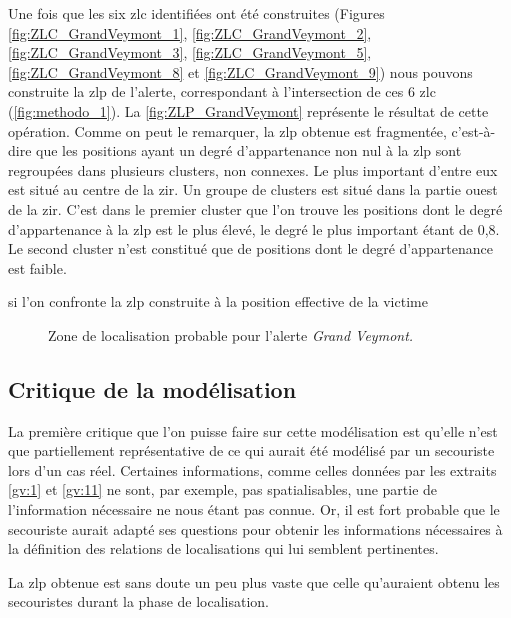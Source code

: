 Une fois que les six \ac{zlc} identifiées ont été construites (Figures
\ref{fig:ZLC_GrandVeymont_1}, \ref{fig:ZLC_GrandVeymont_2},
\ref{fig:ZLC_GrandVeymont_3}, \ref{fig:ZLC_GrandVeymont_5},
\ref{fig:ZLC_GrandVeymont_8} et \ref{fig:ZLC_GrandVeymont_9}) nous
pouvons construite la \ac{zlp} de l'alerte, correspondant à
l'intersection de ces 6 \ac{zlc} (\autoref{fig:methodo_1}). La
\autoref{fig:ZLP_GrandVeymont} représente le résultat de cette
opération. Comme on peut le remarquer, la \ac{zlp} obtenue est
fragmentée, c'est-à-dire que les positions ayant un degré
d'appartenance non nul à la \ac{zlp} sont regroupées dans plusieurs
clusters, non connexes. Le plus important d'entre eux est situé au
centre de la \ac{zir}. Un groupe de clusters est situé dans la partie
ouest de la \ac{zir}. C'est dans le premier cluster que l'on trouve
les positions dont le degré d'appartenance à la \ac{zlp} est le plus
élevé, le degré le plus important étant de 0,8. Le second cluster
n'est constitué que de positions dont le degré d'appartenance est
faible.

si l'on confronte la \ac{zlp} construite à la position effective de la
victime 


\begin{figure}
  \centering
  
  \caption{Zone de localisation probable pour l'alerte \emph{Grand
      Veymont.}}
  \label{fig:ZLP_GrandVeymont}
\end{figure}


\subsection{Critique de la modélisation}
\label{subsec:9-2-3}


La première critique que l'on puisse faire sur cette modélisation est
qu'elle n'est que partiellement représentative de ce qui aurait été
modélisé par un secouriste lors d'un cas réel. Certaines informations,
comme celles données par les extraits \ref{gv:1} et \ref{gv:11} ne
sont, par exemple, pas spatialisables, une partie de l'information
nécessaire ne nous étant pas connue. Or, il est fort probable que le
secouriste aurait adapté ses questions pour obtenir les informations
nécessaires à la définition des relations de localisations qui lui
semblent pertinentes.

La \ac{zlp} obtenue est sans doute un peu plus vaste que celle
qu'auraient obtenu les secouristes durant la phase de localisation.



